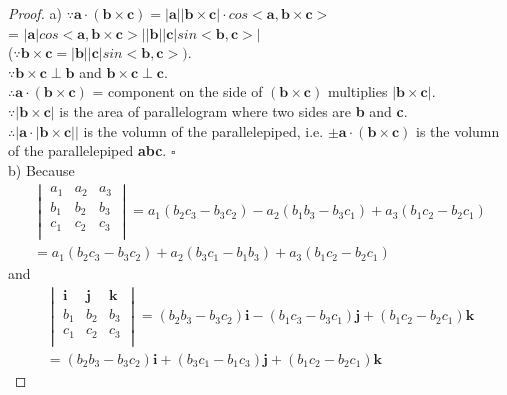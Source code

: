 \documentclass{article}
\begin{document}
\begin{proof}
a) $\because \mathbf{a} \cdot (\mathbf{b} \times \mathbf{c}) = |\mathbf{a}||\mathbf{b} \times \mathbf{c}| \cdot cos<\mathbf{a}, \mathbf{b} \times \mathbf{c}>$ 
\\ = $|\mathbf{a}|cos<\mathbf{a}, \mathbf{b} \times \mathbf{c}>||\mathbf{b}||\mathbf{c}|sin<\mathbf{b},\mathbf{c}>|$ 
\\ ($\because \mathbf{b} \times \mathbf{c}= |\mathbf{b}||\mathbf{c}|sin<\mathbf{b},\mathbf{c}>)$.
\\$\because \mathbf{b} \times \mathbf{c} \perp \mathbf{b}$ and $\mathbf{b} \times \mathbf{c} \perp \mathbf{c}$. 
\\ $\therefore \mathbf{a} \cdot (\mathbf{b} \times \mathbf{c})$ = component on the side of $(\mathbf{b} \times \mathbf{c})$ multiplies $|\mathbf{b} \times \mathbf{c}|$.
\\ $\because |\mathbf{b} \times \mathbf{c}|$ is the area of parallelogram where two sides are \textbf{b} and \textbf{c}.
\\ $\therefore |\mathbf{a}\cdot|\mathbf{b}\times\mathbf{c}||$ is the volumn of the parallelepiped, i.e. $\pm \mathbf{a}\cdot(\mathbf{b} \times \mathbf{c})$ is the volumn of the parallelepiped \textbf{abc}. $\square$
\\b) Because
\begin{align*} 
  \begin{vmatrix}
  a_1 & a_2 & a_3 \\
  b_1 & b_2 & b_3 \\
  c_1 & c_2 & c_3 \\
  \end{vmatrix}
= a_1(b_2 c_3 - b_3 c_2) - a_2(b_1 b_3 - b_3 c_1) + a_3(b_1 c_2 - b_2 c_1)
\\ = a_1(b_2 c_3 - b_3 c_2) + a_2(b_3 c_1 - b_1 b_3) + a_3(b_1 c_2 - b_2 c_1)
\end{align*}
and
\begin{align*}
    \begin{vmatrix}
    \mathbf{i} & \mathbf{j} & \mathbf{k} \\
    b_1 & b_2 & b_3 \\
    c_1 & c_2 & c_3 \\
    \end{vmatrix}
    = (b_2 b_3 - b_3 c_2)\mathbf{i} - (b_1 c_3 - b_3 c_1) \mathbf{j} + (b_1 c_2 - b_2 c_1) \mathbf{k}
\\  = (b_2 b_3 - b_3 c_2)\mathbf{i} + (b_3 c_1 - b_1 c_3) \mathbf{j} + (b_1 c_2 - b_2 c_1) \mathbf{k}
\end{align*}

\end{proof}
\end{document}

